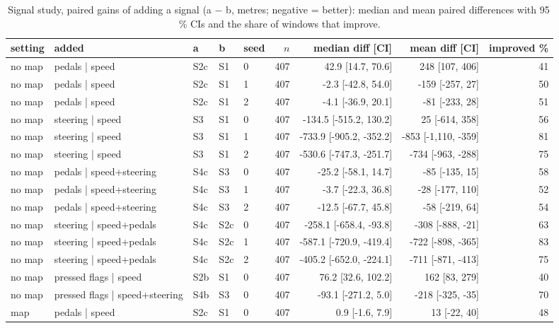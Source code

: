 \begin{table}[t]\centering\scriptsize\setlength{\tabcolsep}{3pt}
\caption{Signal study, paired gains of adding a signal (a $-$ b, metres; negative = better): median and mean paired differences with 95\,\% CIs and the share of windows that improve.}\label{tab:supp_signal_gains}
\begin{tabular}{lllllrrrr}\toprule
setting & added & a & b & seed & $n$ & median diff [CI] & mean diff [CI] & improved \% \\\midrule
no map & pedals | speed & S2c & S1 & 0 & 407 & 42.9 [14.7, 70.6] & 248 [107, 406] & 41 \\
no map & pedals | speed & S2c & S1 & 1 & 407 & -2.3 [-42.8, 54.0] & -159 [-257, 27] & 50 \\
no map & pedals | speed & S2c & S1 & 2 & 407 & -4.1 [-36.9, 20.1] & -81 [-233, 28] & 51 \\
no map & steering | speed & S3 & S1 & 0 & 407 & -134.5 [-515.2, 130.2] & 25 [-614, 358] & 56 \\
no map & steering | speed & S3 & S1 & 1 & 407 & -733.9 [-905.2, -352.2] & -853 [-1{,}110, -359] & 81 \\
no map & steering | speed & S3 & S1 & 2 & 407 & -530.6 [-747.3, -251.7] & -734 [-963, -288] & 75 \\
no map & pedals | speed+steering & S4c & S3 & 0 & 407 & -25.2 [-58.1, 14.7] & -85 [-135, 15] & 58 \\
no map & pedals | speed+steering & S4c & S3 & 1 & 407 & -3.7 [-22.3, 36.8] & -28 [-177, 110] & 52 \\
no map & pedals | speed+steering & S4c & S3 & 2 & 407 & -12.5 [-67.7, 45.8] & -58 [-219, 64] & 54 \\
no map & steering | speed+pedals & S4c & S2c & 0 & 407 & -258.1 [-658.4, -93.8] & -308 [-888, -21] & 63 \\
no map & steering | speed+pedals & S4c & S2c & 1 & 407 & -587.1 [-720.9, -419.4] & -722 [-898, -365] & 83 \\
no map & steering | speed+pedals & S4c & S2c & 2 & 407 & -405.2 [-652.0, -224.1] & -711 [-871, -413] & 75 \\
no map & pressed flags | speed & S2b & S1 & 0 & 407 & 76.2 [32.6, 102.2] & 162 [83, 279] & 40 \\
no map & pressed flags | speed+steering & S4b & S3 & 0 & 407 & -93.1 [-271.2, 5.0] & -218 [-325, -35] & 70 \\
map & pedals | speed & S2c & S1 & 0 & 407 & 0.9 [-1.6, 7.9] & 13 [-22, 40] & 48 \\

\end{tabular}
\end{table}
